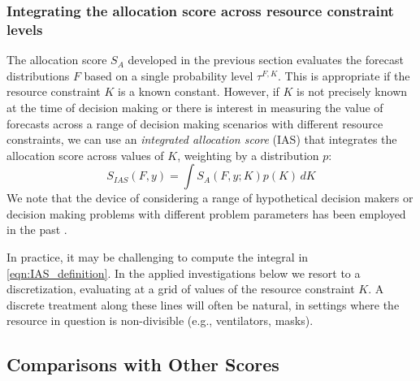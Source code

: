 \documentclass{article}
\begin{document}
\subsubsection{Integrating the allocation score across resource constraint levels}{}
\label{sec:methods.detailed.integrated_allocation}

The allocation score $S_A$ developed in the previous section evaluates the forecast distributions
$F$ based on a single probability level $\tau^{F,K}$. This is appropriate if the resource constraint $K$ is a known
constant. However, if $K$ is not precisely known at the time of decision making or there is interest in measuring the
value of forecasts across a range of decision making scenarios with different resource constraints, we can use an
\emph{integrated allocation score} (IAS) that integrates the allocation score across values of $K$, weighting by a
distribution $p$:
\begin{equation}
S_{IAS}(F, y) = \int S_A(F,y; K) p(K) \, dK \label{eqn:IAS_definition}
\end{equation}
We note that the device of considering a range of hypothetical decision makers or decision making problems with
different problem parameters has been employed in the past \cite[e.g.,][]{murphy1993whatisagoodforecast}.

In practice, it may be challenging to compute the integral in \eqref{eqn:IAS_definition}.
In the applied investigations below we resort to a discretization, evaluating at a grid of values of the resource constraint $K$.
A discrete treatment along these lines will often be natural, in settings where the resource in question is non-divisible (e.g., ventilators, masks).

\subsection{Comparisons with Other Scores}
\label{sec:methods.related}
\end{document}
